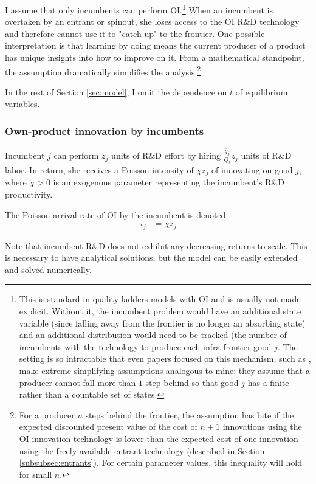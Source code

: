 \documentclass[11pt,english]{article}
\begin{document}
I assume that only incumbents can perform OI.\footnote{This is standard in quality ladders models with OI and is usually not made explicit. Without it, the incumbent problem would have an additional state variable (since falling away from the frontier is no longer an absorbing state) and an additional distribution would need to be tracked (the number of incumbents with the technology to produce each infra-frontier good $j$. The setting is so intractable that even papers focused on this mechanism, such as \cite{aghion_competition_2005}, make extreme simplifying assumptions analogous to mine: they assume that a producer cannot fall more than $1$ step behind so that good $j$ has a finite rather than a countable set of states.} When an incumbent is overtaken by an entrant or spinout, she loses access to the OI R\&D technology and therefore cannot use it to "catch up" to the frontier. One possible interpretation is that learning by doing means the current producer of a product has unique insights into how to improve on it. From a mathematical standpoint, the assumption dramatically simplifies the analysis.\footnote{For a producer $n$ steps behind the frontier, the assumption has bite if the expected discounted present value of the cost of $n + 1$ innovations using the OI innovation technology is lower than the expected cost of one innovation using the freely available entrant technology (described in Section \ref{subsubsec:entrants}). For certain parameter values, this inequality will hold for small $n$.}  

In the rest of Section \ref{sec:model}, I omit the dependence on $t$ of equilibrium variables. 

\subsubsection{Own-product innovation by incumbents} \label{subsubsec:OI}

Incumbent $j$ can perform $z_j$ units of R\&D effort by hiring $\frac{\bar{q}_{j}}{Q_t}z_j$ units of R\&D labor. In return, she receives a Poisson intensity of $\chi z_j$ of innovating on good $j$, where $\chi > 0$ is an exogenous parameter representing the incumbent's R\&D productivity. 

The Poisson arrival rate of OI by the incumbent is denoted
\begin{align}
	\tau_j &= \chi z_j
\end{align}

Note that incumbent R\&D does not exhibit any decreasing returns to scale. This is necessary to have analytical solutions, but the model can be easily extended and solved numerically.
\end{document}
